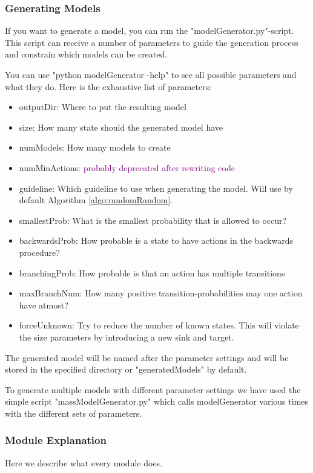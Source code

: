 \subsubsection*{Generating Models}
If you want to generate a model, you can run the "modelGenerator.py"-script.
This script can receive a number of parameters to guide the generation process and constrain which models can be created.

You can use "python modelGenerator -help" to see all possible parameters and what they do.
Here is the exhaustive list of parameters:
\begin{itemize} \label{list:params}
    \item outputDir: Where to put the resulting model
    \item size: How many state should the generated model have
    \item numModels: How many models to create
    \item numMinActions: \textcolor{purple}{probably deprecated after rewriting code}
    \item guideline: Which guideline to use when generating the model. Will use by default Algorithm \ref{algo:randomRandom}.
    \item smallestProb: What is the smallest probability that is allowed to occur?
    \item backwardsProb: How probable is a state to have actions in the backwards procedure?
    \item branchingProb: How probable is that an action has multiple transitions
    \item maxBranchNum: How many positive transition-probabilities may one action have atmost?
    \item forceUnknown: Try to reduce the number of known states. This will violate the size parameters by introducing a new sink and target.
\end{itemize}

The generated model will be named after the parameter settings and will be stored in the specified directory or "generatedModels" by default.

To generate multiple models with different parameter settings we have used the simple script "massModelGenerator.py" which calls modelGenerator various times with the different sets of parameters.

\subsubsection*{Module Explanation}
Here we describe what every module does.

